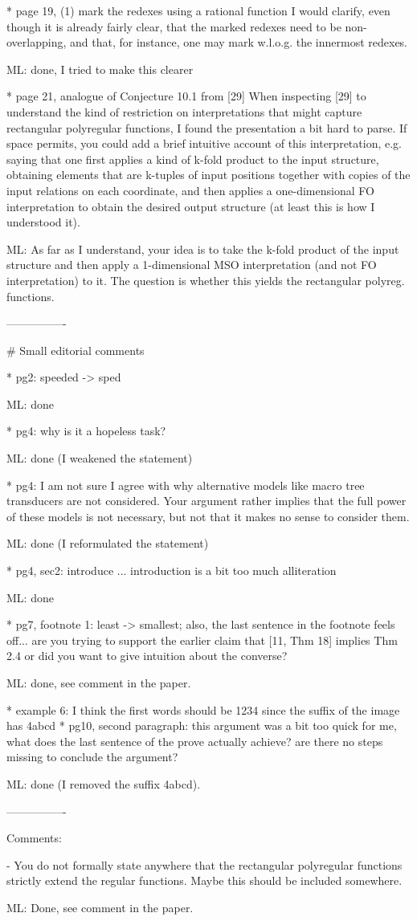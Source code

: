 * page 19, (1) mark the redexes using a rational function
I would clarify, even though it is already fairly clear, that the marked redexes need to be 
non-overlapping, and that, for instance, one may mark w.l.o.g. the innermost redexes.

ML: done, I tried to make this clearer

* page 21, analogue of Conjecture 10.1 from [29]
When inspecting [29] to understand the kind of restriction on interpretations that might capture 
rectangular polyregular functions, I found the presentation a bit hard to parse. If space permits, 
you could add a brief intuitive account of this interpretation, e.g. saying that one first applies 
a kind of k-fold product to the input structure, obtaining elements that are k-tuples of input 
positions together with copies of the input relations on each coordinate, and then applies a 
one-dimensional FO interpretation to obtain the desired output structure (at least this is how 
I understood it).

ML: As far as I understand, your idea is to take the k-fold product of the input structure and then
apply a 1-dimensional MSO interpretation (and not FO interpretation) to it. The question is whether
this yields the rectangular polyreg. functions.

----------------

# Small editorial comments

* pg2: speeded -> sped 

ML: done

* pg4: why is it a hopeless task?

ML: done (I weakened the statement)

* pg4: I am not sure I agree with why alternative models like macro tree transducers are not considered. Your argument rather implies that the full power of these models is not necessary, but not that it makes no sense to consider them.

ML: done (I reformulated the statement)

* pg4, sec2: introduce ... introduction is a bit too much alliteration

ML: done

* pg7, footnote 1: least -> smallest; also, the last sentence in the footnote feels off... are you trying to support the earlier claim that [11, Thm 18] implies Thm 2.4 or did you want to give intuition about the converse?

ML: done, see comment in the paper.

* example 6: I think the first words should be 1234 since the suffix of the image has 4abcd
* pg10, second paragraph: this argument was a bit too quick for me, what does the last sentence of the prove actually achieve? are there no steps missing to conclude the argument?

ML: done (I removed the suffix 4abcd).

----------------

Comments:

- You do not formally state anywhere that the rectangular polyregular functions strictly extend the regular functions. Maybe this should be included somewhere.

ML: Done, see comment in the paper.

